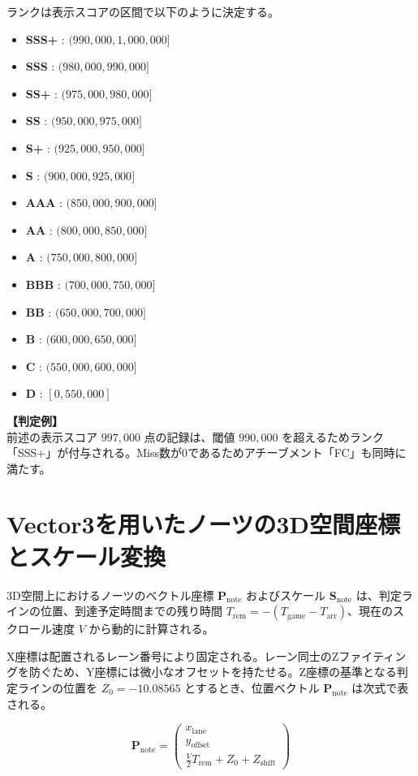 \documentclass[a4paper,11pt]{ltjsarticle}
\begin{document}
ランクは表示スコアの区間で以下のように決定する。
\begin{itemize}
    \item \textbf{SSS+} : $(990,000, 1,000,000]$
    \item \textbf{SSS}  : $(980,000, 990,000]$
    \item \textbf{SS+}  : $(975,000, 980,000]$
    \item \textbf{SS}   : $(950,000, 975,000]$
    \item \textbf{S+}   : $(925,000, 950,000]$
    \item \textbf{S}    : $(900,000, 925,000]$
    \item \textbf{AAA}  : $(850,000, 900,000]$
    \item \textbf{AA}   : $(800,000, 850,000]$
    \item \textbf{A}    : $(750,000, 800,000]$
    \item \textbf{BBB}  : $(700,000, 750,000]$
    \item \textbf{BB}   : $(650,000, 700,000]$
    \item \textbf{B}    : $(600,000, 650,000]$
    \item \textbf{C}    : $(550,000, 600,000]$
    \item \textbf{D}    : $[0, 550,000]$
\end{itemize}

\textbf{【判定例】} \\
前述の表示スコア $997,000$ 点の記録は、閾値 $990,000$ を超えるためランク「SSS+」が付与される。Miss数が0であるためアチーブメント「FC」も同時に満たす。

\section{Vector3を用いたノーツの3D空間座標とスケール変換}

3D空間上におけるノーツのベクトル座標 $\bm{P}_{\mathrm{note}}$ およびスケール $\bm{S}_{\mathrm{note}}$ は、判定ラインの位置、到達予定時間までの残り時間 $T_{\mathrm{rem}} = -(T_{\mathrm{game}} - T_{\mathrm{arr}})$、現在のスクロール速度 $V$ から動的に計算される。

X座標は配置されるレーン番号により固定される。レーン同士のZファイティングを防ぐため、Y座標には微小なオフセットを持たせる。Z座標の基準となる判定ラインの位置を $Z_0 = -10.08565$ とするとき、位置ベクトル $\bm{P}_{\mathrm{note}}$ は次式で表される。

\begin{equation}
    \bm{P}_{\mathrm{note}} = 
    \begin{pmatrix}
    x_{\mathrm{lane}} \\
    y_{\mathrm{offset}} \\
    \frac{V}{2} T_{\mathrm{rem}} + Z_0 + Z_{\mathrm{shift}}
    \end{pmatrix}
\end{equation}
\end{document}
